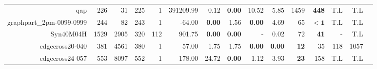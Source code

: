 \begin{table*}[t]
\begin{tabular}{|r|r|r|r|r||r||r|r|r|r||r|r|r|r|r|}
                              qap &          226 &           31 &         225 &           1 &         391209.99 &          0.12 &\textbf{0.00} &         10.52 &          5.85 &         1459 &       \textbf{448} &          T.L &          T.L \\ 
         graphpart\_2pm-0099-0999 &          244 &           82 &         243 &           1 &            -64.00 & \textbf{0.00} &         1.56 & \textbf{0.00} &          4.69 &           65 &         $\bm{< 1}$ &          T.L &          T.L \\ 
                        Syn40M04H &         1529 &         2905 &         320 &         112 &            901.75 & \textbf{0.00} &\textbf{0.00} &             - &          0.02 &           72 &        \textbf{41} &            - &          T.L \\ 
                  edgecross20-040 &          381 &         4561 &         380 &           1 &             57.00 &          1.75 &         1.75 & \textbf{0.00} & \textbf{0.00} &  \textbf{12} &                 35 &          118 &         1057 \\ 
                  edgecross24-057 &          553 &         8097 &         552 &           1 &            178.00 &         24.72 &\textbf{0.00} &          1.12 &          3.93 &  \textbf{23} &                158 &          T.L &          T.L \\ 
\hline 
\end{tabular}\\ 
\label{table:results} 
\end{table*} 
